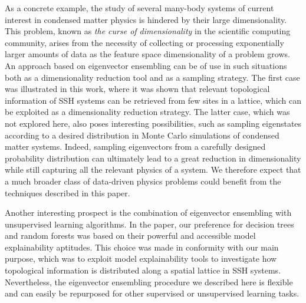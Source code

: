 \documentclass[10pt]{revtex4-1}
\begin{document}
As a concrete example, the study of several many-body systems of current interest in condensed matter physics is hindered by their large dimensionality. This problem, known as \emph{the curse of dimensionality} in the scientific computing community, arises from the necessity of collecting or processing exponentially larger amounts of data as the feature space dimensionality of a problem grows. An approach based on eigenvector ensembling can be of use in such situations both as a dimensionality reduction tool and as a sampling strategy. The first case was illustrated in this work, where it was shown that relevant topological information of SSH systems can be retrieved from few sites in a lattice, which can be exploited as a dimensionality reduction strategy. The latter case, which was not explored here, also poses interesting possibilities, such as sampling eigenstates according to a desired distribution in Monte Carlo simulations of condensed matter systems. Indeed, sampling eigenvectors from a carefully designed probability distribution can ultimately lead to a great reduction in dimensionality  while still capturing all the relevant physics of a system. We therefore expect that a much broader class of data-driven physics problems could benefit from the techniques described in this paper.

Another interesting prospect is the combination of eigenvector ensembling with unsupervised learning algorithms. In the paper, our preference for decision trees and random forests was based on their powerful and accessible model explainability aptitudes. This choice was made in conformity with our main purpose, which was to exploit model explainability tools to investigate how topological information is distributed along a spatial lattice in SSH systems. Nevertheless, the eigenvector ensembling procedure we described here is flexible and can easily be repurposed for other supervised or unsupervised learning tasks.
\end{document}

